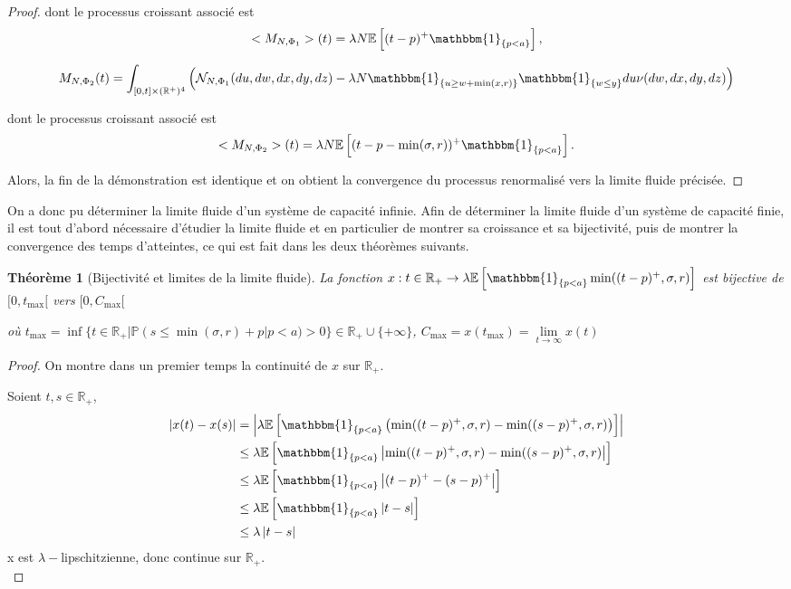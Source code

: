 \documentclass[12pt,a4paper]{article}
\newcommand{\E}[1]{\mathbb{E}\left[ #1 \right]}
\newcommand{\R}{\mathbb{R}}
\newcommand{\1}[1]{\mathbbm{1}_{\{#1\}} }
\newtheorem{theorem}{Théorème}
\theoremstyle{definition}
\begin{document}
{\begin{proof}
dont le processus croissant associé est $$<M_{N,\Phi_1}>(t) = \lambda N \E{(t-p)^+\1{p<a}},$$

$$M_{N,\Phi_2}(t) = \int_{[0,t]\times (\R^+)^4}  \left(\mathcal{N}_{N,\Phi_1}(du,dw,dx,dy,dz)-\lambda N \1{u\geq w+\min(x,r)}\1{w\leq y} du \nu(dw,dx,dy,dz)\right)$$

dont le processus croissant associé est $$<M_{N,\Phi_2}>(t) = \lambda N \E{(t-p-\min(\sigma,r))^+\1{p<a}}.$$

Alors, la fin de la démonstration est identique  et on obtient la convergence du processus renormalisé vers la limite fluide précisée.

\end{proof}

On a donc pu déterminer la limite fluide d'un système de capacité infinie. Afin de déterminer la limite fluide d'un système de capacité finie, il est tout d'abord nécessaire d'étudier la limite fluide et en particulier de montrer sa croissance et sa bijectivité, puis de montrer la convergence des temps d'atteintes, ce qui est fait dans les deux théorèmes suivants.

\begin{theorem}[Bijectivité et limites de la limite fluide]

La fonction $x:t\in \R_+\to  \lambda\E{\1{p<a}\min((t-p)^+,\sigma,r)}$ est bijective de $[0,t_{\max}[$ vers $[0,C_{\max}[$

où $t_{\max} =  \inf \{t \in \R_+ | \mathbb{P}\left(s \leq \min(\sigma,r) + p\right|p<a) > 0\} \in \R_+\cup \{+\infty\}$,
$C_{\max} = x(t_{\max}) = \underset{t\to \infty}{\lim} x(t)$

\end{theorem}

\begin{proof}

On montre dans un premier temps la continuité de $x$ sur $\R_+$.

Soient $t,s \in \R_+$,
\begin{align*}
|x(t) - x(s)| &=\left| \lambda\E{\1{p<a}\left(\min((t-p)^+,\sigma,r)-\min((s-p)^+,\sigma,r)\right)}\right|\\
&\leq \lambda\E{\1{p<a}\left|\min((t-p)^+,\sigma,r)-\min((s-p)^+,\sigma,r)\right|}\\
&\leq \lambda\E{\1{p<a}\left|(t-p)^+-(s-p)^+\right|}\\
&\leq \lambda\E{\1{p<a}\left|t-s\right|}\\
&\leq \lambda\left|t-s\right|
\end{align*} 
x est $\lambda-$lipschitzienne, donc continue sur $\R_+$.\\
\medskip


\end{proof}}
\end{document}
